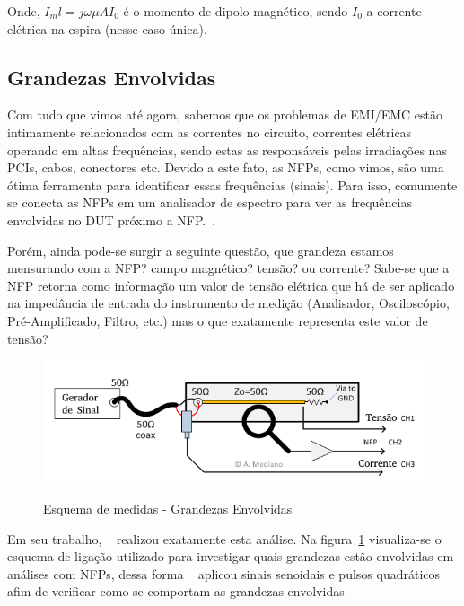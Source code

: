 Onde, $I_m l = j \omega \mu A I_0$ é o momento de dipolo magnético, sendo $I_0$ a corrente elétrica na espira (nesse caso única).



\subsection{Grandezas Envolvidas}
Com tudo que vimos até agora, sabemos que os problemas de EMI/EMC estão intimamente relacionados com as correntes no circuito, correntes elétricas operando em altas frequências, sendo estas as responsáveis pelas irradiações nas PCIs, cabos, conectores etc. Devido a este fato, as NFPs, como vimos, são uma ótima ferramenta para identificar essas frequências (sinais). Para isso, comumente se conecta as NFPs em um analisador de espectro para ver as frequências envolvidas no DUT próximo a NFP.~\cite[p.~1]{mediado2018}.

Porém, ainda pode-se surgir a seguinte questão, que grandeza estamos mensurando com a NFP? campo magnético? tensão? ou corrente? Sabe-se que a NFP retorna como informação um valor de tensão elétrica que há de ser aplicado na impedância de entrada do instrumento de medição (Analisador, Osciloscópio, Pré-Amplificado, Filtro, etc.) mas o que exatamente representa este valor de tensão?

\begin{figure}[htb!]
	\centering 
	\caption{Esquema de medidas - Grandezas Envolvidas}
	\includegraphics[scale=1]{./img/mediano2018}
	\label{fig:mediano2018}
\end{figure}

Em seu trabalho, ~ realizou exatamente esta análise. Na figura~\ref{fig:mediano2018} visualiza-se o esquema de ligação utilizado para investigar quais grandezas estão envolvidas em análises com NFPs, dessa forma ~ aplicou sinais senoidais e pulsos quadráticos afim de verificar como se comportam as grandezas envolvidas


